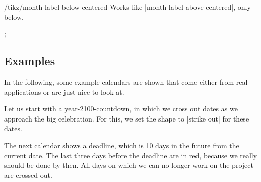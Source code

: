 \begin{stylekey}{/tikz/month label below centered}
  Works like |month label above centered|, only below.
\begin{codeexample}[]
\tikz
  \calendar [dates=2000-02-01 to 2000-02-last,
             day list right,month label below centered];
\end{codeexample}
\end{stylekey}



\subsection{Examples}

In the following, some example calendars are shown that come either
from real applications or are just nice to look at.

Let us start with a year-2100-countdown, in which we cross out dates
as we approach the big celebration. For
this, we set the shape to |strike out| for these dates.

\begin{codeexample}
\end{codeexample}

The next calendar shows a deadline, which is 10 days in the future
from the current date. The last three days before the deadline are in
red, because we really should be done by then. All days on which we
can no longer work on the project are crossed out.

\begin{codeexample}
\end{codeexample}

